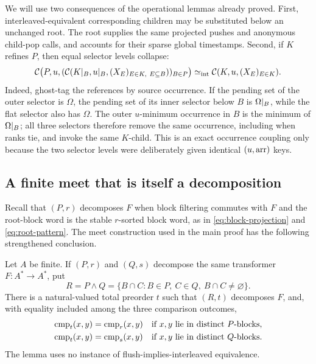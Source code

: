 We will use two consequences of the operational lemmas already proved.  First,
interleaved-equivalent corresponding children may be substituted below an
unchanged root.  The root supplies the same projected pushes and anonymous
child-pop calls, and  accounts for their sparse global
timestamps.  Second, if \(K\) refines \(P\), then equal selector levels
collapse:
\begin{equation}
 \mathcal C\bigl(P,u,
   (\mathcal C(K|_B,u|_B,
      (X_E)_{E\in K,\ E\subseteq B}))_{B\in P}\bigr)
 \mathrel{\simeq_{\mathrm{int}}}
 \mathcal C(K,u,(X_E)_{E\in K}).
 \label{eq:selector-tandem-law}
\end{equation}
Indeed, ghost-tag the references by source occurrence.  If the pending set of
the outer selector is \(\Omega\), the pending set of its inner selector below
\(B\) is \(\Omega\mathord{|}_{B}\), while the flat selector also has
\(\Omega\).  The outer \(u\)-minimum occurrence in \(B\) is the minimum of
\(\Omega\mathord{|}_{B}\); all three selectors therefore remove the same
occurrence, including when ranks tie, and invoke the same \(K\)-child.  This
is an exact occurrence coupling only because the two selector levels were
deliberately given identical \((u,\operatorname{arr})\) keys.

\subsection{A finite meet that is itself a decomposition}

Recall that \((P,r)\) decomposes \(F\) when block filtering commutes with \(F\)
and the root-block word is the stable \(r\)-sorted block word, as in
\autoref{eq:block-projection} and \autoref{eq:root-pattern}.  The meet construction used in the
main proof has the following strengthened conclusion.

\begin{lemma}
\label{lem:finite-meet-decomposition}
Let \(A\) be finite.  If \((P,r)\) and \((Q,s)\) decompose the same transformer
\(F:A^*\to A^*\), put
\[
 R=P\wedge Q
   =\{B\cap C:B\in P,\ C\in Q,\ B\cap C\ne\varnothing\}.
\]
There is a natural-valued total preorder \(t\) such that \((R,t)\) decomposes
\(F\), and, with equality included among the three comparison outcomes,
\begin{align}
 \operatorname{cmp}_t(x,y)&=\operatorname{cmp}_r(x,y)
   &&\text{if \(x,y\) lie in distinct \(P\)-blocks},\notag\\
 \operatorname{cmp}_t(x,y)&=\operatorname{cmp}_s(x,y)
   &&\text{if \(x,y\) lie in distinct \(Q\)-blocks}.
 \label{eq:finite-meet-interfaces}
\end{align}
The lemma uses no instance of flush-implies-interleaved equivalence.
\end{lemma}

